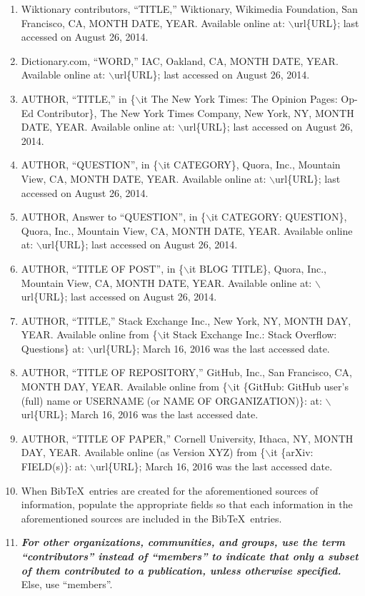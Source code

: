 \documentclass[letter,12pt]{article}
\begin{document}
\begin{enumerate}
\begin{enumerate}
	\item Wiktionary contributors, ``TITLE,'' Wiktionary, Wikimedia Foundation, San Francisco, CA, MONTH DATE, YEAR. Available online at: $\backslash$url\{URL\}; last accessed on August 26, 2014.
	\item Dictionary.com, ``WORD,'' IAC, Oakland, CA, MONTH DATE, YEAR. Available online at: $\backslash$url\{URL\}; last accessed on August 26, 2014.
	\item AUTHOR, ``TITLE,'' in \{$\backslash$it The New York Times: The Opinion Pages: Op-Ed Contributor\}, The New York Times Company, New York, NY, MONTH DATE, YEAR. Available online at: $\backslash$url\{URL\}; last accessed on August 26, 2014.
	\item AUTHOR, ``QUESTION'', in \{$\backslash$it CATEGORY\}, Quora, Inc., Mountain View, CA, MONTH DATE, YEAR. Available online at: $\backslash$url\{URL\}; last accessed on August 26, 2014.
	\item AUTHOR, Answer to ``QUESTION'', in \{$\backslash$it CATEGORY: QUESTION\}, Quora, Inc., Mountain View, CA, MONTH DATE, YEAR. Available online at: $\backslash$url\{URL\}; last accessed on August 26, 2014.
	\item AUTHOR, ``TITLE OF POST'', in \{$\backslash$it BLOG TITLE\}, Quora, Inc., Mountain View, CA, MONTH DATE, YEAR. Available online at: $\backslash$url\{URL\}; last accessed on August 26, 2014.
	\item AUTHOR, ``TITLE,'' Stack Exchange Inc., New York, NY, MONTH DAY, YEAR. Available online from \{$\backslash$it Stack Exchange Inc.: Stack Overflow: Questions\} at: $\backslash$url\{URL\}; March 16, 2016 was the last accessed date.
	\item AUTHOR, ``TITLE OF REPOSITORY,'' GitHub, Inc., San Francisco, CA, MONTH DAY, YEAR. Available online from \{$\backslash$it \{GitHub: GitHub user's (full) name or USERNAME (or NAME OF ORGANIZATION)\}: at: $\backslash$url\{URL\}; March 16, 2016 was the last accessed date.
	\item AUTHOR, ``TITLE OF PAPER,'' Cornell University, Ithaca, NY, MONTH DAY, YEAR. Available online (as Version XYZ) from \{$\backslash$it \{arXiv: FIELD(s)\}: at: $\backslash$url\{URL\}; March 16, 2016 was the last accessed date.
	\item When {\sc Bib}\TeX\ entries are created for the aforementioned sources of information, populate the appropriate fields so that each information in the aforementioned sources are included in the {\sc Bib}\TeX\ entries.
	\item {\it \bf For other organizations, communities, and groups, use the term ``contributors'' instead of ``members'' to indicate that only a subset of them contributed to a publication, unless otherwise specified.} Else, use ``members''.

\end{enumerate}
\end{enumerate}
\end{document}
